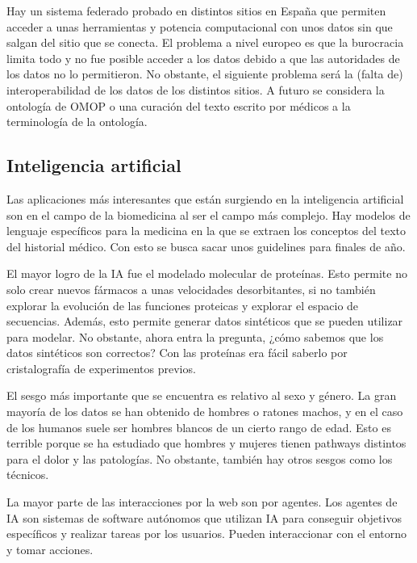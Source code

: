 Hay un sistema federado probado en distintos sitios en España que permiten acceder a unas herramientas y potencia computacional con unos datos sin que salgan del sitio que se conecta. El problema a nivel europeo es que la burocracia limita todo y no fue posible acceder a los datos debido a que las autoridades de los datos no lo permitieron. No obstante, el siguiente problema será la (falta de) interoperabilidad de los datos de los distintos sitios. A futuro se considera la ontología de OMOP o una curación del texto escrito por médicos a la terminología de la ontología.

\subsection{Inteligencia artificial}
Las aplicaciones más interesantes que están surgiendo en la inteligencia artificial son en el campo de la biomedicina al ser el campo más complejo. Hay modelos de lenguaje específicos para la medicina en la que se extraen los conceptos del texto del historial médico. Con esto se busca sacar unos guidelines para finales de año. 

El mayor logro de la IA fue el modelado molecular de proteínas. Esto permite no solo crear nuevos fármacos a unas velocidades desorbitantes, si no también explorar la evolución de las funciones proteicas y explorar el espacio de secuencias. Además, esto permite generar datos sintéticos que se pueden utilizar para modelar. No obstante, ahora entra la pregunta, ¿cómo sabemos que los datos sintéticos son correctos? Con las proteínas era fácil saberlo por cristalografía de experimentos previos. 

El sesgo más importante que se encuentra es relativo al sexo y género. La gran mayoría de los datos se han obtenido de hombres o ratones machos, y en el caso de los humanos suele ser hombres blancos de un cierto rango de edad. Esto es terrible porque se ha estudiado que hombres y mujeres tienen pathways distintos para el dolor y las patologías. No obstante, también hay otros sesgos como los técnicos.

La mayor parte de las interacciones por la web son por agentes. Los agentes de IA son sistemas de software autónomos que utilizan IA para conseguir objetivos específicos y realizar tareas por los usuarios. Pueden interaccionar con el entorno y tomar acciones. 
